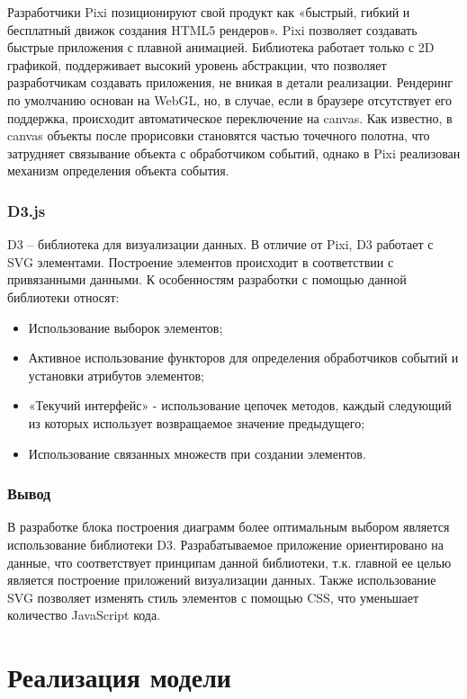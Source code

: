 Разработчики Pixi позиционируют свой продукт как «быстрый, гибкий и бесплатный движок создания HTML5 рендеров». Pixi позволяет создавать быстрые приложения с плавной анимацией. Библиотека работает только с 2D графикой, поддерживает высокий уровень абстракции, что позволяет разработчикам создавать приложения, не вникая в детали реализации. Рендеринг по умолчанию основан на WebGL, но, в случае, если в браузере отсутствует его поддержка, происходит автоматическое переключение на canvas. Как известно, в canvas объекты после прорисовки становятся частью точечного полотна, что затрудняет связывание объекта с обработчиком событий, однако в Pixi реализован механизм определения объекта события.

\subsubsection{D3.js}

D3 – библиотека для визуализации данных. В отличие от Pixi, D3 работает с SVG элементами. Построение элементов происходит в соответствии с привязанными данными. К особенностям разработки с помощью данной библиотеки относят:

\begin{itemize}
	\item Использование выборок элементов;
	\item Активное использование функторов для определения обработчиков событий и установки атрибутов элементов;
	\item «Текучий интерфейс» - использование цепочек методов, каждый следующий из которых использует возвращаемое значение предыдущего;
	\item Использование связанных множеств при создании элементов.
\end{itemize}

\subsubsection{Вывод}

В разработке блока построения диаграмм более оптимальным выбором является использование библиотеки D3. Разрабатываемое приложение ориентировано на данные, что соответствует принципам данной библиотеки, т.к. главной ее целью является построение приложений визуализации данных.  Также использование SVG позволяет изменять стиль элементов с помощью CSS, что уменьшает количество JavaScript кода.

\section{Реализация модели}

